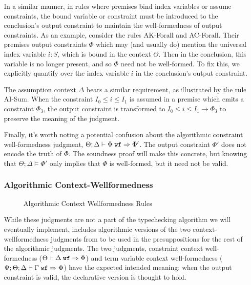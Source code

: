 In a similar manner, in rules where premises bind index variables or assume constraints, the bound variable or constraint must be introduced to the conclusion's output constraint to maintain the well-formedness of output constraints. As an example, consider the rules AK-Forall and AC-Forall. Their premises output constraints $\Phi$ which may (and usually do) mention the universal index variable $i : S$, which is bound in the context $\Theta$. Then in the conclusion, this variable is no longer present, and so $\Phi$ need not be well-formed. To fix this, we explicitly quantify over the index variable $i$ in the conclusion's output constraint. 

The assumption context $\Delta$ bears a similar requirement, as illustrated by the rule AI-Sum. When the constraint $I_0 \leq i \leq I_1$ is assumed in a premise which emits a constraint $\Phi_3$, the output constraint is transformed to $I_0 \leq i \leq I_1 \to \Phi_3$ to preserve the meaning of the judgment.

Finally, it's worth noting a potential confusion about the algorithmic constraint well-formedness judgment, $\Theta ; \Delta \vdash \Phi \; \texttt{wf} \Rightarrow \Phi'$.
The output constraint $\Phi'$ does not encode the truth of $\Phi$. The soundness proof will make this concrete, but knowing that $\Theta ; \Delta \vDash \Phi'$ only implies that $\Phi$ is well-formed, but it need not be valid.

\subsubsection{Algorithmic Context-Wellformedness}
\begin{figure}

\label{fig:bilambdaamor-ctx-wf-rules}
\caption{Algorithmic Context Wellformedness Rules}
\end{figure}

While these judgments are not a part of the typechecking algorithm we will eventually implement, \bilambdaamor includes algorithmic versions of the two context-wellformedness judgments from \dlambdaamor to be used in the presuppositions for the rest of the algorithmic judgments. The two judgments, constraint context well-formedness ($\Theta \vdash \Delta \; \texttt{wf} \Rightarrow \Phi$) and term variable context well-formedness ($\Psi ; \Theta ; \Delta \vdash \Gamma \; \texttt{wf} \Rightarrow \Phi$) have the expected intended meaning: when the output constraint is valid, the declarative version is thought to hold.

